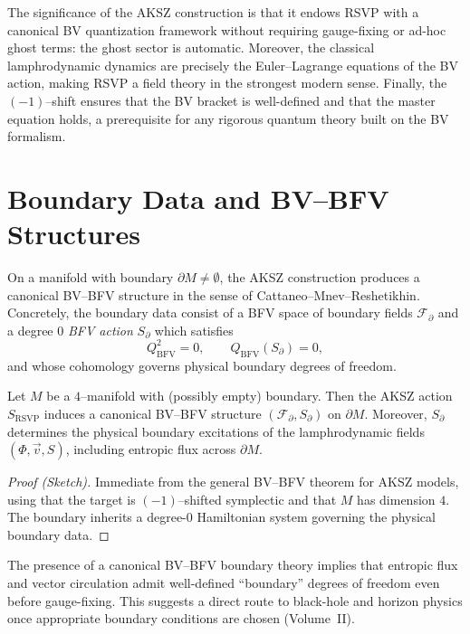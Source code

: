 The significance of the AKSZ construction is that it
endows RSVP with a canonical BV quantization framework without requiring
gauge-fixing or ad-hoc ghost terms: the ghost sector is automatic.
Moreover, the classical lamphrodynamic dynamics are precisely the
Euler--Lagrange equations of the BV action, making RSVP a field theory
in the strongest modern sense. Finally, the $(-1)$–shift ensures that
the BV bracket is well-defined and that the master equation holds,
a prerequisite for any rigorous quantum theory built on the BV
formalism.

\section{Boundary Data and BV--BFV Structures}
\label{sec:RSVP-BFV}

On a manifold with boundary $\partial M\neq\emptyset$, the AKSZ
construction produces a canonical BV--BFV structure in the sense of
Cattaneo--Mnev--Reshetikhin. Concretely, the boundary data
consist of a BFV space of boundary fields $\mathcal{F}_{\partial}$ and
a degree $0$ \emph{BFV action} $S_{\partial}$ which satisfies
\[
Q_{\mathrm{BFV}}^2=0,\qquad
Q_{\mathrm{BFV}}(S_{\partial})=0,
\]
and whose cohomology governs physical boundary degrees of freedom.

\begin{theorem}
\label{thm:RSVP-BFV}
Let $M$ be a $4$--manifold with (possibly empty) boundary.
Then the AKSZ action $S_{\mathrm{RSVP}}$
induces a canonical BV--BFV structure
$(\mathcal{F}_{\partial},S_{\partial})$ on $\partial M$.
Moreover, $S_{\partial}$ determines the physical boundary excitations of
the lamphrodynamic fields $(\Phi,\vec v,S)$, including entropic flux
across $\partial M$.
\end{theorem}

\begin{proof}[Proof (Sketch)]
Immediate from the general BV--BFV theorem for AKSZ models, using that
the target is $(-1)$--shifted symplectic and that $M$ has dimension $4$.
The boundary inherits a degree-$0$ Hamiltonian system governing the
physical boundary data.
\end{proof}

\begin{remark}
The presence of a canonical BV--BFV boundary theory implies that
entropic flux and vector circulation admit well-defined ``boundary''
degrees of freedom even before gauge-fixing.
This suggests a direct route to black-hole and horizon physics once
appropriate boundary conditions are chosen (Volume~II).
\end{remark}



